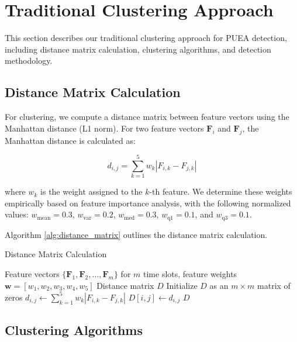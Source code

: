 \documentclass[conference]{IEEEtran}
\begin{document}
\section{Traditional Clustering Approach}
\label{sec:traditional_clustering}

This section describes our traditional clustering approach for PUEA detection, including distance matrix calculation, clustering algorithms, and detection methodology.

\subsection{Distance Matrix Calculation}

For clustering, we compute a distance matrix between feature vectors using the Manhattan distance (L1 norm). For two feature vectors $\mathbf{F}_i$ and $\mathbf{F}_j$, the Manhattan distance is calculated as:

\begin{equation}
d_{i,j} = \sum_{k=1}^{5} w_k |F_{i,k} - F_{j,k}|
\end{equation}

where $w_k$ is the weight assigned to the $k$-th feature. We determine these weights empirically based on feature importance analysis, with the following normalized values: $w_{\text{mean}} = 0.3$, $w_{\text{var}} = 0.2$, $w_{\text{med}} = 0.3$, $w_{\text{q1}} = 0.1$, and $w_{\text{q3}} = 0.1$.

Algorithm \ref{alg:distance_matrix} outlines the distance matrix calculation.

\begin{algorithm}
\caption{Distance Matrix Calculation}
\label{alg:distance_matrix}
\begin{algorithmic}[1]
\REQUIRE Feature vectors $\{\mathbf{F}_1, \mathbf{F}_2, \ldots, \mathbf{F}_m\}$ for $m$ time slots, feature weights $\mathbf{w} = [w_1, w_2, w_3, w_4, w_5]$
\ENSURE Distance matrix $D$
\STATE Initialize $D$ as an $m \times m$ matrix of zeros
        \STATE $d_{i,j} \gets \sum_{k=1}^{5} w_k |F_{i,k} - F_{j,k}|$
        \STATE $D[i,j] \gets d_{i,j}$
    \ENDFOR
\ENDFOR
\RETURN $D$
\end{algorithmic}
\end{algorithm}

\subsection{Clustering Algorithms}
\end{document}
